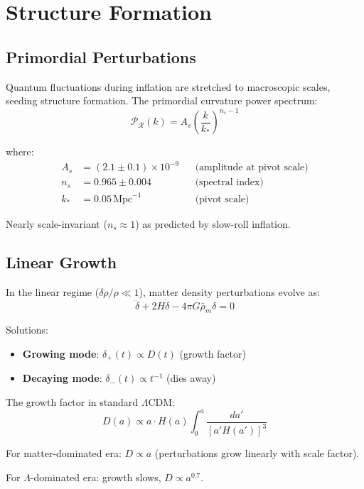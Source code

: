 \section{Structure Formation}

\subsection{Primordial Perturbations}

\begin{defn}\label{def:primordial-power}
Quantum fluctuations during inflation are stretched to macroscopic scales, seeding structure formation. The primordial curvature power spectrum\cite{mukhanov2005,guth1981}:
\begin{equation}
\mathcal{P}_\mathcal{R}(k) = A_s \left( \frac{k}{k_*} \right)^{n_s - 1}
\end{equation}

where:
\begin{align}
A_s &= (2.1 \pm 0.1) \times 10^{-9} && \text{(amplitude at pivot scale)} \\
n_s &= 0.965 \pm 0.004 && \text{(spectral index)} \\
k_* &= 0.05 \, \text{Mpc}^{-1} && \text{(pivot scale)}
\end{align}

Nearly scale-invariant ($n_s \approx 1$) as predicted by slow-roll inflation.
\end{defn}

\subsection{Linear Growth}

\begin{theorem}\label{thm:linear-growth}
In the linear regime ($\delta \rho / \rho \ll 1$), matter density perturbations evolve as\cite{peebles1980,dodelson2003}:
\begin{equation}
\ddot{\delta} + 2H \dot{\delta} - 4\pi G \bar{\rho}_m \delta = 0
\end{equation}

Solutions:
\begin{itemize}
\item \textbf{Growing mode}: $\delta_+(t) \propto D(t)$ (growth factor)
\item \textbf{Decaying mode}: $\delta_-(t) \propto t^{-1}$ (dies away)
\end{itemize}

The growth factor in standard $\Lambda$CDM:
\begin{equation}
D(a) \propto a \cdot H(a) \int_0^a \frac{da'}{[a' H(a')]^3}
\end{equation}

For matter-dominated era: $D \propto a$ (perturbations grow linearly with scale factor).

For $\Lambda$-dominated era: growth slows, $D \propto a^{0.7}$.
\end{theorem}

